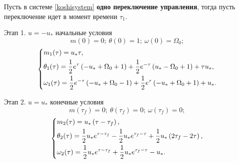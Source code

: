 \documentclass[a4paper,12pt, openany]{book}
\theoremstyle{plain} %
\theoremstyle{definition} %
\theoremstyle{remark} %
\numberwithin{equation}{chapter}
\begin{document}
{Пусть в системе \eqref{koshisystem} \textbf{одно переключение управления}, тогда пусть переключение идет в момент времени $\tau_1$.

Этап 1. $u=-u_*$ начальные условия
\[
    m(0)=0;\ \theta(0)=1;\ \omega(0)=\Omega_0;
\]
\begin{equation}\label{solvekoshi}
    \left\{ {\begin{aligned}
                 & m_1(\tau) = u_* \tau, \hfill                                                            \\
                 & \theta_1(\tau) = \frac{1}{2} e^{\tau } \left(-u_*+\Omega _0+1\right)+\frac{1}{2} e^{-\tau } \left(u_*-\Omega _0+1\right)+\tau  u_*, \hfill                                                          \\
                 & \omega_1(\tau) = \frac{1}{2} e^{-\tau } \left(-u_*+\Omega _0-1\right)+\frac{1}{2} e^{\tau } \left(-u_*+\Omega _0+1\right)+u_*. \hfill                                                               \\
            \end{aligned}} \right.
\end{equation}

Этап 2. $u=u_*$ конечные условия
\[
    m(\tau_f)=0; \ \theta(\tau_f)=0;\ \omega(\tau_f)=0;
\]
\begin{equation}\label{solvekoshi}
    \left\{ {\begin{aligned}
                 & m_2(\tau) = u_* \left(\tau-\tau _f\right), \hfill                                                            \\
                 & \theta_2(\tau) = \frac{1}{2} u_* e^{\tau -\tau _f}-\frac{1}{2} u_* e^{\tau _f-\tau }+\frac{1}{2} u_* \left(2 \tau _f-2 \tau \right), \hfill                                                          \\
                 & \omega_2(\tau) = \frac{1}{2} u_* e^{\tau -\tau _f}+\frac{1}{2} u_* e^{\tau _f-\tau }-u_*. \hfill                                                               \\
            \end{aligned}} \right.
\end{equation}

}
\end{document}
